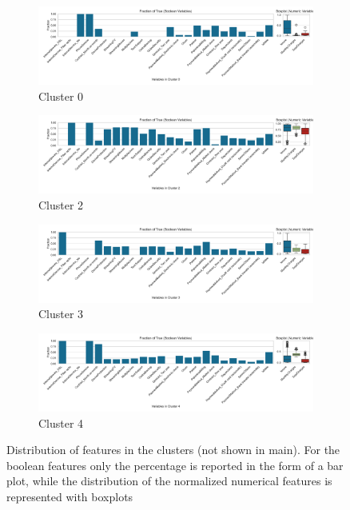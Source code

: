 \documentclass[a4paper,11pt]{article}
\begin{document}
\begin{figure}
\centering
\begin{subfigure}{\linewidth}
    \includegraphics[width=\linewidth]{figures/clustering/cluster_0_clusters.pdf}
\caption{Cluster 0}
\label{fig:cluster_0}
\end{subfigure}
\begin{subfigure}{\linewidth}
    \includegraphics[width=\linewidth]{figures/clustering/cluster_2_clusters.pdf}
\caption{Cluster 2}
\label{fig:cluster_2}
\end{subfigure}
\begin{subfigure}{\linewidth}
    \includegraphics[width=\linewidth]{figures/clustering/cluster_3_clusters.pdf}
\caption{Cluster 3}
\label{fig:cluster_3}
\end{subfigure}
\begin{subfigure}{\linewidth}
    \includegraphics[width=\linewidth]{figures/clustering/cluster_4_clusters.pdf}
\caption{Cluster 4}
\label{fig:cluster_4}
\end{subfigure}
\caption{Distribution of features in the clusters (not shown in main). For the boolean features only the percentage is reported in the form of a bar plot, while the distribution of the normalized numerical features is represented with boxplots}
\end{figure}
\end{document}
